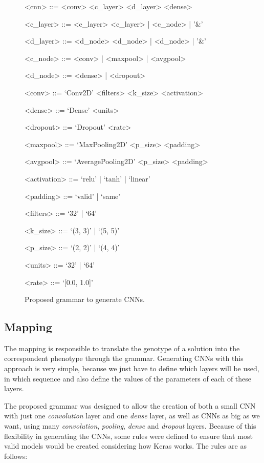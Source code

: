 \documentclass[12pt]{article}
\begin{document}
\begin{figure}[!htb]
	\begin{grammar}
		<cnn> ::= <conv> <c\_layer> <d\_layer> <dense>
		
		<c\_layer> ::= <c\_layer> <c\_layer> | <c\_node> | '\&'
		
		<d\_layer> ::= <d\_node> <d\_node> | <d\_node> | '\&'
		
		<c\_node> ::= <conv> | <maxpool> | <avgpool>
		
		<d\_node> ::= <dense> | <dropout>
		
		<conv> ::= `Conv2D' <filters> <k\_size> <activation>
		
		<dense> ::= `Dense' <units>
		
		<dropout> ::= `Dropout' <rate>
		
		<maxpool> ::= `MaxPooling2D' <p\_size> <padding>
		
		<avgpool> ::= `AveragePooling2D' <p\_size> <padding>
		
		<activation> ::= `relu' | `tanh' | `linear'
		
		<padding> ::= `valid' | `same'
		
		<filters> ::= `32' | `64'
		
		<k\_size> ::= `(3, 3)' | `(5, 5)'
		
		<p\_size> ::= `(2, 2)' | `(4, 4)'
		
		<units> ::= `32' | `64'
		
		<rate> ::= `[0.0, 1.0]'
		
	\end{grammar}
	\caption{Proposed grammar to generate CNNs.}
	\label{fig:cnn-grammar}
\end{figure}


\subsection{Mapping}


The mapping is responsible to translate the genotype of a solution into the correspondent phenotype through the grammar. Generating CNNs with this approach is very simple, because we just have to define which layers will be used, in which sequence and also define the values of the parameters of each of these layers.


The proposed grammar was designed to allow the creation of both a small CNN with just one \textit{convolution} layer and one \textit{dense} layer, as well as CNNs as big as we want, using many \textit{convolution}, \textit{pooling}, \textit{dense} and \textit{dropout} layers. Because of this flexibility in generating the CNNs, some rules were defined to ensure that most valid models would be created considering how Keras works. The rules are as follows:
\end{document}
